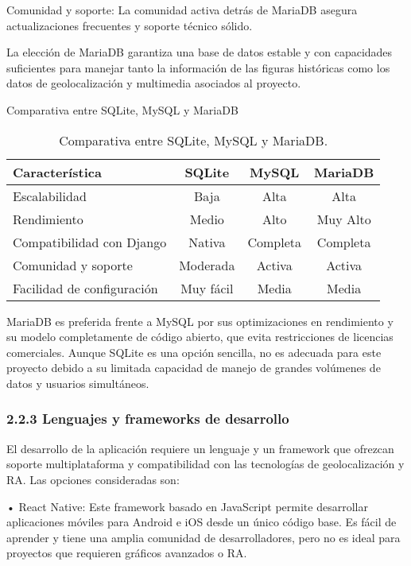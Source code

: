 Comunidad y soporte: La comunidad activa detrás de MariaDB asegura actualizaciones frecuentes y soporte técnico sólido.

La elección de MariaDB garantiza una base de datos estable y con capacidades suficientes para manejar tanto la información de las figuras históricas como los datos de geolocalización y multimedia asociados al proyecto.

Comparativa entre SQLite, MySQL y MariaDB
\begin{table}
    \centering
    \begin{tabular}{|l|c|c|c|}
        \hline
        \textbf{Característica} & \textbf{SQLite} & \textbf{MySQL} & \textbf{MariaDB} \\ \hline
        Escalabilidad & Baja & Alta & Alta \\ \hline
        Rendimiento & Medio & Alto & Muy Alto \\ \hline
        Compatibilidad con Django & Nativa & Completa & Completa \\ \hline
        Comunidad y soporte & Moderada & Activa & Activa \\ \hline
        Facilidad de configuración & Muy fácil & Media & Media \\ \hline
    \end{tabular}
    \caption{Comparativa entre SQLite, MySQL y MariaDB.}
    \label{tabla:comparativa_bases_datos}
\end{table}


MariaDB es preferida frente a MySQL por sus optimizaciones en rendimiento y su modelo completamente de código abierto, que evita restricciones de licencias comerciales. Aunque SQLite es una opción sencilla, no es adecuada para este proyecto debido a su limitada capacidad de manejo de grandes volúmenes de datos y usuarios simultáneos.

\subsubsection{2.2.3 Lenguajes y frameworks de desarrollo}

El desarrollo de la aplicación requiere un lenguaje y un framework que ofrezcan soporte multiplataforma y compatibilidad con las tecnologías de geolocalización y RA. Las opciones consideradas son:

	•	React Native: Este framework basado en JavaScript permite desarrollar aplicaciones móviles para Android e iOS desde un único código base. Es fácil de aprender y tiene una amplia comunidad de desarrolladores, pero no es ideal para proyectos que requieren gráficos avanzados o RA.
    
